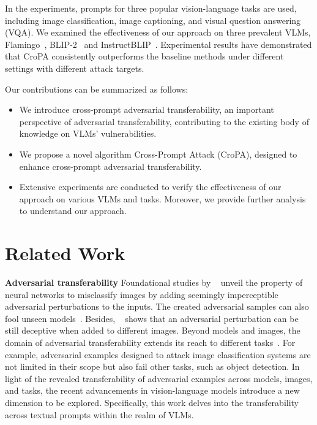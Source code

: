In the experiments, prompts for three popular vision-language tasks are used, including image classification, image captioning, and visual question answering (VQA). We examined the effectiveness of our approach on three prevalent VLMs,  Flamingo~\citep{alayrac2022flamingo}, BLIP-2~\citep{li2023blip} and InstructBLIP~\citep{Dai2023InstructBLIP}. Experimental results have demonstrated that CroPA consistently outperforms the baseline methods under different settings with different attack targets. 

Our contributions can be summarized as follows:
\vspace{-0.2cm}
\begin{itemize} 
    \item  We introduce cross-prompt adversarial transferability, an important perspective of adversarial transferability, contributing to the existing body of knowledge on VLMs' vulnerabilities.
    \item  We propose a novel algorithm Cross-Prompt Attack (CroPA), designed to enhance cross-prompt adversarial transferability.
    \item  Extensive experiments are conducted to verify the effectiveness of our approach on various VLMs and tasks. Moreover, we provide further analysis to understand our approach.
\end{itemize}

\section{Related Work}
\vspace{-0.3cm}
\noindent\textbf{Adversarial transferability} Foundational studies by ~\citep{szegedy2013intriguing,goodfellow2014explaining} unveil the property of neural networks to misclassify images by adding seemingly imperceptible adversarial perturbations to the inputs. The created adversarial samples can also fool unseen models~\citep{gu2023survey,yu2023reliable,liu2016delving,papernot2016transferability}. Besides, ~\cite{mopuri2017fast,moosavi2017universal} shows that an adversarial perturbation can be still deceptive when added to different images. Beyond models and images, the domain of adversarial transferability extends its reach to different tasks~\citep{naseer2018task,naseer2019cross,lu2020enhancing,salzmann2021learning_transferable_nips}. For example, adversarial examples designed to attack image classification systems are not limited in their scope but also fail other tasks, such as object detection. In light of the revealed transferability of adversarial examples across models, images, and tasks, the recent advancements in vision-language models introduce a new dimension to be explored. Specifically, this work delves into the transferability across textual prompts within the realm of VLMs.

